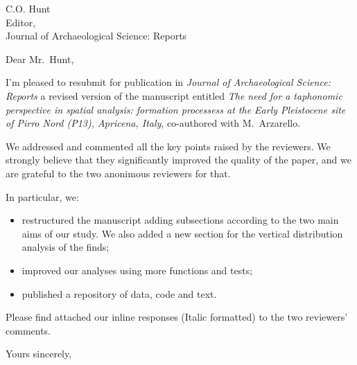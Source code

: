\documentclass[version=last,a4paper]{scrlttr2}
\begin{document}
\begin{letter}{C.O. Hunt\\
Editor, \\
Journal of Archaeological Science: Reports}

  
\opening{Dear Mr.~Hunt,}

I'm pleased to resubmit for publication in \emph{Journal of Archaeological Science: Reports} a revised version of the manuscript entitled \emph{The need for a taphonomic perspective in spatial analysis: formation processess at the Early Pleistocene site of Pirro Nord (P13), Apricena, Italy}, co-authored with M.~Arzarello.

\vspace{0.1in}

We addressed and commented all the key points raised by the reviewers. We strongly believe that they significantly improved the quality of the paper, and we are grateful to the two anonimous reviewers for that.

In particular, we:

\begin{itemize}
\item restructured the manuscript adding subsections according to the two main aims of our study. We also added a new section for the vertical distribution analysis of the finds;

\item improved our analyses using more functions and tests;

\item published a repository of data, code and text.
\end{itemize}

\vspace{0.1in}

Please find attached our inline responses (Italic formatted) to the two reviewers' comments.

\vspace{0.1in}

\closing{Yours sincerely,}

\end{letter}
\end{document}
